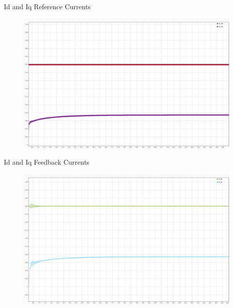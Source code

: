 \begin{frame}{Id and Iq Reference Currents}
	\begin{figure}
		\centering
		\includegraphics[width=\textwidth]{sections/section3/images/simulationResutls/Id_ref_Iq_ref.png}
	\end{figure}
\end{frame}

\begin{frame}{Id and Iq Feedback Currents}
	\begin{figure}
		\centering
		\includegraphics[width=\textwidth]{sections/section3/images/simulationResutls/Id_fb_Iq_fb.png}
	\end{figure}
\end{frame}

